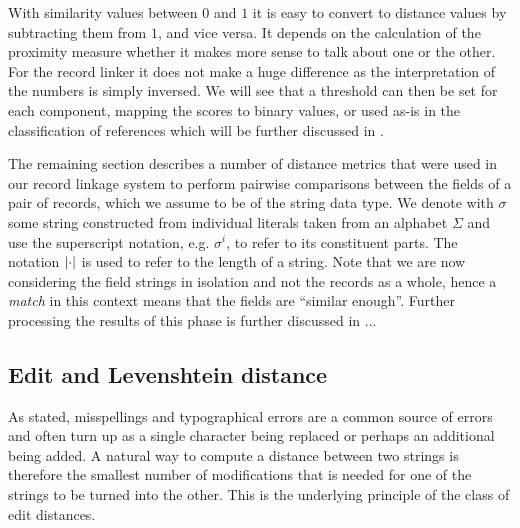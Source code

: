 With similarity values between $0$ and $1$ it is easy to convert to distance values by subtracting them from $1$, and vice versa.
It depends on the calculation of the proximity measure whether it makes more sense to talk about one or the other.
For the record linker it does not make a huge difference as the interpretation of the numbers is simply inversed.
We will see that a threshold can then be set for each component, mapping the scores to binary values, or used as-is in the classification of references which will be further discussed in .

The remaining section describes a number of distance metrics that were used in our record linkage system to perform pairwise comparisons between the fields of a pair of records, which we assume to be of the string data type.
We denote with $\sigma$ some string constructed from individual literals taken from an alphabet $\Sigma$ and use the superscript notation, e.g. $\sigma^{i}$, to refer to its constituent parts.
The notation $\lvert\cdot\rvert$ is used to refer to the length of a string.
Note that we are now considering the field strings in isolation and not the records as a whole, hence a \emph{match} in this context means that the fields are ``similar enough''.
Further processing the results of this phase is further discussed in ...




\subsection{Edit and Levenshtein distance}
\label{sec:edit_distance}

As stated, misspellings and typographical errors are a common source of errors and often turn up as a single character being replaced or perhaps an additional being added.
A natural way to compute a distance between two strings is therefore the smallest number of modifications that is needed for one of the strings to be turned into the other.
This is the underlying principle of the class of edit distances.

